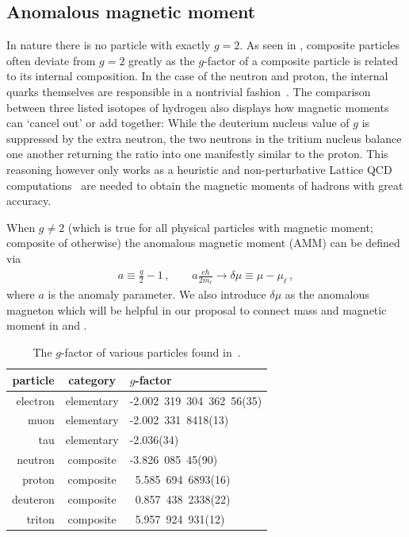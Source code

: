 \subsection{Anomalous magnetic moment}
In nature there is no particle with exactly $g\!=\!2$. As seen in , composite particles often deviate from $g\!=\!2$ greatly as the $g$-factor of a composite particle is related to its internal composition. In the case of the neutron and proton, the internal quarks themselves are responsible in a nontrivial fashion~\citep{Chang:2015qxa}. The comparison between three listed isotopes of hydrogen also displays how magnetic moments can `cancel out' or add together: While the deuterium nucleus value of $g$ is suppressed by the extra neutron, the two neutrons in the tritium nucleus balance one another returning the ratio into one manifestly similar to the proton. This reasoning however only works as a heuristic and non-perturbative Lattice QCD computations~\citep{Detmold:2019ghl} are needed to obtain the magnetic moments of hadrons with great accuracy.

When $g\neq2$ (which is true for all physical particles with magnetic moment; composite of otherwise) the anomalous magnetic moment (AMM) can be defined via 
\begin{gather}
    \label{amm:1}
    a\equiv\frac{g}{2}-1\,,\qquad
    a\frac{e\hbar}{2m_{\ell}}\rightarrow\delta\mu\equiv\mu-\mu_{\ell}\,,
\end{gather}
where $a$ is the anomaly parameter. We also introduce $\delta\mu$ as the anomalous magneton which will be helpful in our proposal to connect mass and magnetic moment in  and .

\begin{table}
	\centering
\begin{tabular}{r|c|l}
    particle & category & $g$-factor\\
    \hline
	electron & elementary & -2.002\ 319\ 304\ 362\ 56(35)\\
	muon & elementary & -2.002\ 331\ 8418(13)\\
	tau & elementary & -2.036(34)\\
	neutron & composite & -3.826\ 085\ 45(90)\\
	proton & composite & \ 5.585\ 694\ 6893(16)\\
	deuteron & composite & \ 0.857\ 438\ 2338(22)\\
	triton & composite & \ 5.957\ 924\ 931(12)\\
\end{tabular}
	\caption{The $g$-factor of various particles found in~\cite{Tiesinga:2021myr,ParticleDataGroup:2022pth}.}
	\label{tab:gfactor}
\end{table}

